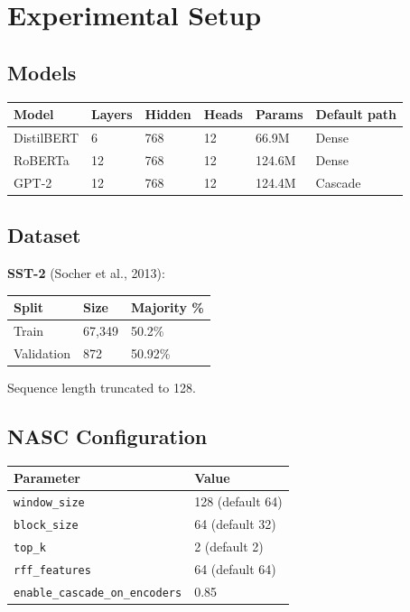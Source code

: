 
\section{Experimental Setup}

\subsection{Models}

\begin{table}[H]
\centering
\small
\begin{tabular}{llllll}
\toprule
\textbf{Model} & \textbf{Layers} & \textbf{Hidden} & \textbf{Heads} & \textbf{Params} & \textbf{Default path} \\
\midrule
DistilBERT & 6 & 768 & 12 & 66.9M & Dense \\
RoBERTa & 12 & 768 & 12 & 124.6M & Dense \\
GPT-2 & 12 & 768 & 12 & 124.4M & Cascade \\
\bottomrule
\end{tabular}
\end{table}

\subsection{Dataset}

\textbf{SST-2} (Socher et al., 2013):

\begin{table}[H]
\centering
\small
\begin{tabular}{lll}
\toprule
\textbf{Split} & \textbf{Size} & \textbf{Majority \%} \\
\midrule
Train & 67,349 & 50.2\% \\
Validation & 872 & 50.92\% \\
\bottomrule
\end{tabular}
\end{table}

Sequence length truncated to 128.

\subsection{NASC Configuration}

\begin{table}[H]
\centering
\small
\begin{tabular}{ll}
\toprule
\textbf{Parameter} & \textbf{Value} \\
\midrule
\texttt{window\_size} & 128 (default 64) \\
\texttt{block\_size} & 64 (default 32) \\
\texttt{top\_k} & 2 (default 2) \\
\texttt{rff\_features} & 64 (default 64) \\
\texttt{enable\_cascade\_on\_encoders} & 0.85 \\
\bottomrule
\end{tabular}
\end{table}

